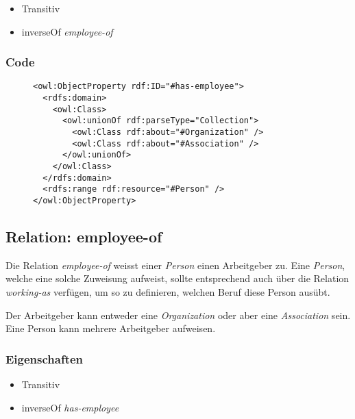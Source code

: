 \documentclass[
    11pt,
    latin1,
    a4paper,
    oneside
]{scrreprt}
\begin{document}
\begin{itemize}
  \item Transitiv
  \item inverseOf \emph{employee-of}
\end{itemize}

\subsubsection{Code} \label{sec:rel_hasemployee_code}

\begin{figure}[h]
 \lstset{language=XML}
 \begin{lstlisting}[label=owl:hasemployee,caption={Die Relation \emph{has-employee} gibt an, welche \emph{Person} bei der \emph{Organization} oder \emph{Association} angestellt sind}]
<owl:ObjectProperty rdf:ID="#has-employee">
  <rdfs:domain>
    <owl:Class>
      <owl:unionOf rdf:parseType="Collection">
        <owl:Class rdf:about="#Organization" />
        <owl:Class rdf:about="#Association" />
      </owl:unionOf>
    </owl:Class>
  </rdfs:domain>
  <rdfs:range rdf:resource="#Person" />
</owl:ObjectProperty>
 \end{lstlisting}
\end{figure}


\subsection{Relation: employee-of} \label{sec:rel_employeeof}

Die Relation \emph{employee-of} weisst einer \emph{Person} einen Arbeitgeber zu. Eine \emph{Person}, welche eine solche Zuweisung aufweist, sollte entsprechend auch über die Relation \emph{working-as} verf\"ugen, um so zu definieren, welchen Beruf diese Person aus\"ubt.

Der Arbeitgeber kann entweder eine \emph{Organization} oder aber eine \emph{Association} sein. Eine Person kann mehrere Arbeitgeber aufweisen.

\subsubsection{Eigenschaften} \label{sec:rel_employeeof_settings}

\begin{itemize}
  \item Transitiv
  \item inverseOf \emph{has-employee}
\end{itemize}
\end{document}
